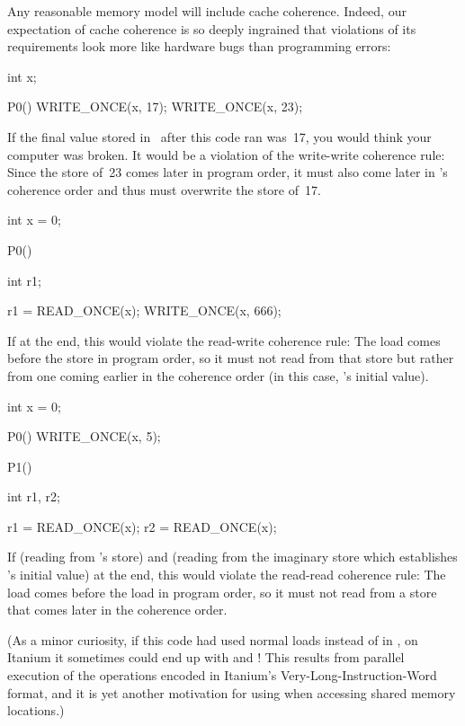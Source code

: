 Any reasonable memory model will include cache coherence.
Indeed, our expectation of cache coherence is so deeply ingrained that
violations of its requirements look more like hardware bugs than
programming errors:

\begin{VerbatimU}
	int x;

	P0()
	{
		WRITE_ONCE(x, 17);
		WRITE_ONCE(x, 23);
	}
\end{VerbatimU}

If the final value stored in~ after this code ran was~17, you would
think your computer was broken.
It would be a violation of the write-write coherence rule:
Since the store of~23 comes later in program order, it must also come
later in 's coherence order and thus must overwrite the store of~17.

\begin{VerbatimU}
	int x = 0;

	P0()
	{
		int r1;

		r1 = READ_ONCE(x);
		WRITE_ONCE(x, 666);
	}
\end{VerbatimU}

If  at the end, this would violate the read-write coherence
rule:
The  load comes before the  store in
program order, so it must not read from that store but rather from one
coming earlier in the coherence order (in this case, 's initial
value).

\begin{VerbatimU}
	int x = 0;

	P0()
	{
		WRITE_ONCE(x, 5);
	}

	P1()
	{
		int r1, r2;

		r1 = READ_ONCE(x);
		r2 = READ_ONCE(x);
	}
\end{VerbatimU}

If  (reading from 's store) and 
(reading from the imaginary store which establishes 's initial
value) at the end, this would violate the read-read coherence rule:
The  load comes before the  load in program order, so it
must not read from a store that comes later in the coherence order.

(As a minor curiosity, if this code had used normal loads instead of
 in , on Itanium it sometimes could end up with
 and !
This results from parallel execution of the operations encoded in
Itanium's Very-Long-Instruction-Word format, and it is yet another
motivation for using  when accessing shared memory
locations.)

